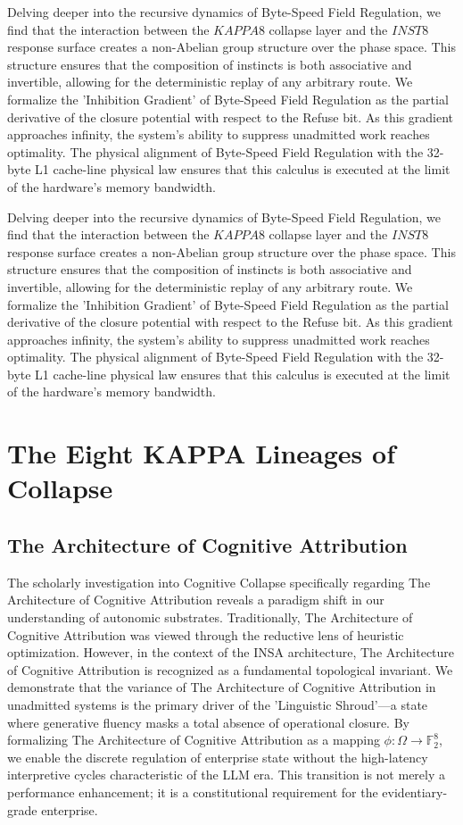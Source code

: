 \documentclass[12pt,a4paper,oneside]{book}
\begin{document}
Delving deeper into the recursive dynamics of Byte-Speed Field Regulation, we find that the interaction between the $KAPPA8$ collapse layer and the $INST8$ response surface creates a non-Abelian group structure over the phase space. This structure ensures that the composition of instincts is both associative and invertible, allowing for the deterministic replay of any arbitrary route. We formalize the 'Inhibition Gradient' of Byte-Speed Field Regulation as the partial derivative of the closure potential with respect to the Refuse bit. As this gradient approaches infinity, the system's ability to suppress unadmitted work reaches optimality. The physical alignment of Byte-Speed Field Regulation with the 32-byte L1 cache-line physical law ensures that this calculus is executed at the limit of the hardware's memory bandwidth. 

Delving deeper into the recursive dynamics of Byte-Speed Field Regulation, we find that the interaction between the $KAPPA8$ collapse layer and the $INST8$ response surface creates a non-Abelian group structure over the phase space. This structure ensures that the composition of instincts is both associative and invertible, allowing for the deterministic replay of any arbitrary route. We formalize the 'Inhibition Gradient' of Byte-Speed Field Regulation as the partial derivative of the closure potential with respect to the Refuse bit. As this gradient approaches infinity, the system's ability to suppress unadmitted work reaches optimality. The physical alignment of Byte-Speed Field Regulation with the 32-byte L1 cache-line physical law ensures that this calculus is executed at the limit of the hardware's memory bandwidth. 

\chapter{The Eight KAPPA Lineages of Collapse}\section{The Architecture of Cognitive Attribution}
The scholarly investigation into Cognitive Collapse specifically regarding The Architecture of Cognitive Attribution reveals a paradigm shift in our understanding of autonomic substrates. Traditionally, The Architecture of Cognitive Attribution was viewed through the reductive lens of heuristic optimization. However, in the context of the INSA architecture, The Architecture of Cognitive Attribution is recognized as a fundamental topological invariant. We demonstrate that the variance of The Architecture of Cognitive Attribution in unadmitted systems is the primary driver of the 'Linguistic Shroud'---a state where generative fluency masks a total absence of operational closure. By formalizing The Architecture of Cognitive Attribution as a mapping $\phi: \Omega \to \mathbb{F}_2^8$, we enable the discrete regulation of enterprise state without the high-latency interpretive cycles characteristic of the LLM era. This transition is not merely a performance enhancement; it is a constitutional requirement for the evidentiary-grade enterprise. 
\end{document}
